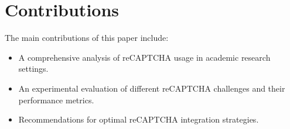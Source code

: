 \documentclass{article}
\begin{document}
\section{Contributions}
The main contributions of this paper include:
\begin{itemize}
    \item A comprehensive analysis of reCAPTCHA usage in academic research settings.
    \item An experimental evaluation of different reCAPTCHA challenges and their performance metrics.
    \item Recommendations for optimal reCAPTCHA integration strategies.
\end{itemize}



\end{document}

